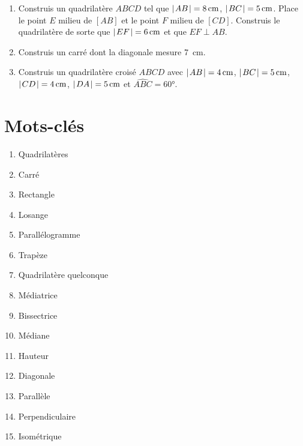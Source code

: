 \documentclass[../../syllabus_1.tex]{subfiles}
\begin{document}
\begin{enumerate}[itemsep=1em]
    \item Construis un quadrilatère $ABCD$ tel que $\lvert\mkern2muAB\mkern2mu\rvert = \qty{8}{cm}$, $\lvert\mkern2muBC\mkern2mu\rvert = \qty{5}{cm}$. Place le point $E$ milieu de $[AB]$ et le point $F$ milieu de $[CD]$. Construis le quadrilatère de sorte que $\lvert\mkern2muEF\mkern2mu\rvert = \qty{6}{cm}$ et que $EF \perp AB$.
    
    \item Construis un carré dont la diagonale mesure \qty{7}{cm}.
    
    \item Construis un quadrilatère croisé $ABCD$ avec $\lvert\mkern2muAB\mkern2mu\rvert = \qty{4}{cm}$, $\lvert\mkern2muBC\mkern2mu\rvert = \qty{5}{cm}$, $\lvert\mkern2muCD\mkern2mu\rvert = \qty{4}{cm}$, $\lvert\mkern2muDA\mkern2mu\rvert = \qty{5}{cm}$ et $\widehat{ABC} = \ang{60}$.
\end{enumerate}

\newpage
\section*{Mots-clés}
\begin{enumerate}[cols=2, label=\textbf{\arabic*.}]
    \item Quadrilatères
    \item Carré
    \item Rectangle
    \item Losange
    \item Parallélogramme
    \item Trapèze
    \item Quadrilatère quelconque
    \item Médiatrice
    \item Bissectrice
    \item Médiane
    \item Hauteur
    \item Diagonale
    \item Parallèle
    \item Perpendiculaire
    \item Isométrique
\end{enumerate}
\end{document}
